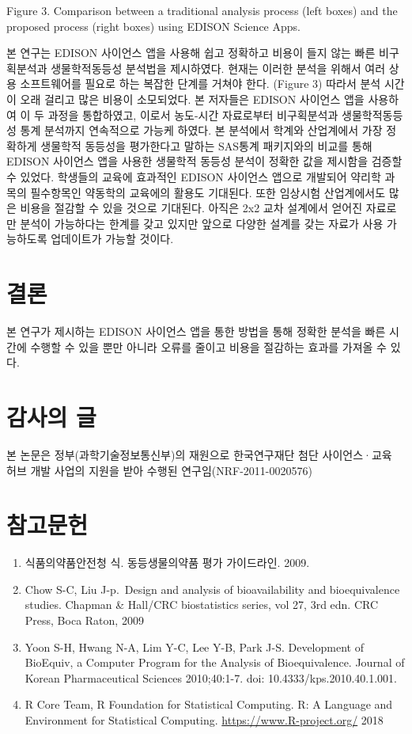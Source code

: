 \documentclass[12pt,]{krantz}
\providecommand{\tightlist}{%
  \setlength{\itemsep}{0pt}\setlength{\parskip}{0pt}}
\begin{document}
Figure 3. Comparison between a traditional analysis process (left boxes) and the proposed process (right boxes) using EDISON Science Apps.

본 연구는 EDISON 사이언스 앱을 사용해 쉽고 정확하고 비용이 들지 않는 빠른 비구획분석과 생물학적동등성 분석법을 제시하였다.
현재는 이러한 분석을 위해서 여러 상용 소프트웨어를 필요로 하는 복잡한 단계를 거쳐야 한다. (Figure 3) 따라서 분석 시간이 오래 걸리고 많은 비용이 소모되었다. 본 저자들은 EDISON 사이언스 앱을 사용하여 이 두 과정을 통합하였고, 이로서 농도-시간 자료로부터 비구획분석과 생물학적동등성 통계 분석까지 연속적으로 가능케 하였다.
본 분석에서 학계와 산업계에서 가장 정확하게 생물학적 동등성을 평가한다고 말하는 SAS통계 패키지와의 비교를 통해 EDISON 사이언스 앱을 사용한 생물학적 동등성 분석이 정확한 값을 제시함을 검증할 수 있었다.
학생들의 교육에 효과적인 EDISON 사이언스 앱으로 개발되어 약리학 과목의 필수항목인 약동학의 교육에의 활용도 기대된다. 또한 임상시험 산업계에서도 많은 비용을 절감할 수 있을 것으로 기대된다.
아직은 2x2 교차 설계에서 얻어진 자료로만 분석이 가능하다는 한계를 갖고 있지만 앞으로 다양한 설계를 갖는 자료가 사용 가능하도록 업데이트가 가능할 것이다.

\hypertarget{conclusion}{%
\chapter{결론}\label{conclusion}}

본 연구가 제시하는 EDISON 사이언스 앱을 통한 방법을 통해 정확한 분석을 빠른 시간에 수행할 수 있을 뿐만 아니라 오류를 줄이고 비용을 절감하는 효과를 가져올 수 있다.

\hypertarget{acknowledgement}{%
\chapter{감사의 글}\label{acknowledgement}}

본 논문은 정부(과학기술정보통신부)의 재원으로 한국연구재단 첨단 사이언스·교육 허브 개발 사업의 지원을 받아 수행된 연구임(NRF-2011-0020576)

\hypertarget{references}{%
\chapter{참고문헌}\label{references}}

\begin{enumerate}
\def\labelenumi{\arabic{enumi}.}
\tightlist
\item
  식품의약품안전청 식. 동등생물의약품 평가 가이드라인. 2009.
\item
  Chow S-C, Liu J-p.~Design and analysis of bioavailability and bioequivalence studies. Chapman \& Hall/CRC biostatistics series, vol 27, 3rd edn. CRC Press, Boca Raton, 2009
\item
  Yoon S-H, Hwang N-A, Lim Y-C, Lee Y-B, Park J-S. Development of BioEquiv, a Computer Program for the Analysis of Bioequivalence. Journal of Korean Pharmaceutical Sciences 2010;40:1-7. doi: 10.4333/kps.2010.40.1.001.
\item
  R Core Team, R Foundation for Statistical Computing. R: A Language and Environment for Statistical Computing. \url{https://www.R-project.org/} 2018
\end{enumerate}
\end{document}
